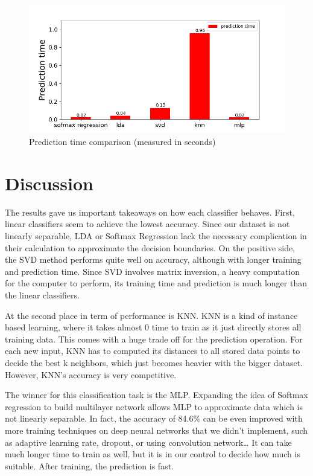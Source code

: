 \documentclass[12,]{article}
\begin{document}
\begin{figure}[H]
  \begin{center}
  \includegraphics[width=0.7\columnwidth]{./prediction_time.png}
  \end{center}
\caption{Prediction time comparison (measured in seconds)}
\end{figure}

\hypertarget{discussion}{%
\section{Discussion}\label{discussion}}

The results gave us important takeaways on how each classifier behaves.
First, linear classifiers seem to achieve the lowest accuracy. Since our
dataset is not linearly separable, LDA or Softmax Regression lack the
necessary complication in their calculation to approximate the decision
boundaries. On the positive side, the SVD method performs quite well on
accuracy, although with longer training and prediction time. Since SVD
involves matrix inversion, a heavy computation for the computer to
perform, its training time and prediction is much longer than the linear
classifiers.

At the second place in term of performance is KNN. KNN is a kind of
instance based learning, where it takes almost 0 time to train as it
just directly stores all training data. This comes with a huge trade off
for the prediction operation. For each new input, KNN has to computed
its distances to all stored data points to decide the best k neighbors,
which just becomes heavier with the bigger dataset. However, KNN's
accuracy is very competitive.

The winner for this classification task is the MLP. Expanding the idea
of Softmax regression to build multilayer network allows MLP to
approximate data which is not linearly separable. In fact, the accuracy
of 84.6\% can be even improved with more training techniques on deep
neural networks that we didn't implement, such as adaptive learning
rate, dropout, or using convolution network\ldots{} It can take much
longer time to train as well, but it is in our control to decide how
much is suitable. After training, the prediction is fast.
\end{document}
